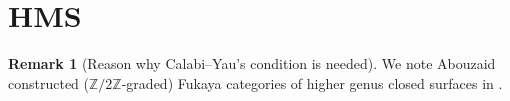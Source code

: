 \documentclass[a4paper,dvipdfmx,reqno,12pt]{amsart}
\theoremstyle{definition}
\newtheorem{Rmk}[Thm]{Remark}
\newcommand{\Z}{\mathbb{Z}}%
\numberwithin{equation}{section}
\begin{document}
\appendix

\section{HMS}

\begin{Rmk}[{Reason why Calabi--Yau's condition is needed}]
We note Abouzaid constructed ($\Z/2\Z$-graded)
Fukaya categories of higher genus closed surfaces in
\cite{MR2383898}. 
\end{Rmk}




\printindex
\end{document}
